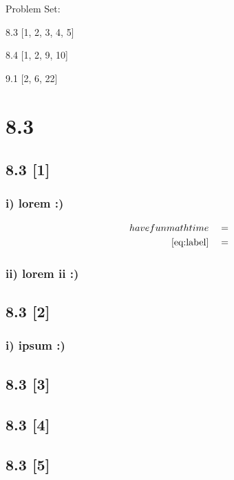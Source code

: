 \documentclass{article}
\begin{document}
{\large \noindent Problem Set:}

\par 8.3 [1, 2, 3, 4, 5]
\par 8.4 [1, 2, 9, 10]
\par 9.1 [2, 6, 22]
\vspace{5mm}

\noindent \hrulefill

\section*{8.3}
\setcounter{equation}{0}

\subsection*{8.3 [1]}

\subsubsection*{i) lorem :)}

\begin{align}
    \label{eq:label}
    have fun math time && &=
    \\
    \label{eq:label2}
    \eqref{eq:label} && &=
\end{align}
\subsubsection*{ii) lorem ii :)}

\subsection*{8.3 [2]}

\subsubsection*{i) ipsum :)}

\subsection*{8.3 [3]}
\subsection*{8.3 [4]}
\subsection*{8.3 [5]}
\end{document}
